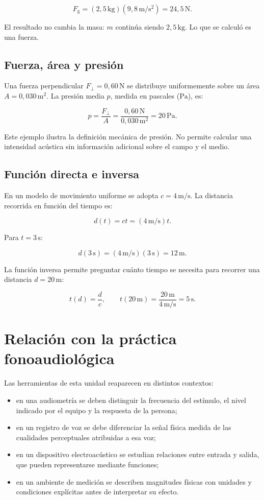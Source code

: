 \[
    F_\mathrm{g}
    =(2{,}5\,\text{kg})(9{,}8\,\text{m}/\text{s}^{2})
    =24{,}5\,\text{N}.
\]

El resultado no cambia la masa: \(m\) continúa siendo \(2{,}5\,\text{kg}\). Lo que se calculó es una fuerza.

\subsection{Fuerza, área y presión}
\label{sec:u1-ejemplo-presion}

Una fuerza perpendicular \(F_\perp=0{,}60\,\text{N}\) se distribuye uniformemente sobre un área \(A=0{,}030\,\text{m}^{2}\). La presión media \(p\), medida en pascales (\(\text{Pa}\)), es:

\[
    p=\frac{F_\perp}{A}
     =\frac{0{,}60\,\text{N}}{0{,}030\,\text{m}^{2}}
     =20\,\text{Pa}.
\]

Este ejemplo ilustra la definición mecánica de presión. No permite calcular una intensidad acústica sin información adicional sobre el campo y el medio.

\subsection{Función directa e inversa}
\label{sec:u1-ejemplo-inversa}

En un modelo de movimiento uniforme se adopta \(c=4\,\text{m}/\text{s}\). La distancia recorrida en función del tiempo es:

\[
    d(t)=ct=(4\,\text{m}/\text{s})t.
\]

Para \(t=3\,\text{s}\):

\[
    d(3\,\text{s})=(4\,\text{m}/\text{s})(3\,\text{s})=12\,\text{m}.
\]

La función inversa permite preguntar cuánto tiempo se necesita para recorrer una distancia \(d=20\,\text{m}\):

\[
    t(d)=\frac{d}{c},
    \qquad
    t(20\,\text{m})
    =\frac{20\,\text{m}}{4\,\text{m}/\text{s}}
    =5\,\text{s}.
\]

\section{Relación con la práctica fonoaudiológica}
\label{sec:u1-relacion-fono}

Las herramientas de esta unidad reaparecen en distintos contextos:

\begin{itemize}
    \item en una audiometría se deben distinguir la frecuencia del estímulo, el nivel indicado por el equipo y la respuesta de la persona;
    \item en un registro de voz se debe diferenciar la señal física medida de las cualidades perceptuales atribuidas a esa voz;
    \item en un dispositivo electroacústico se estudian relaciones entre entrada y salida, que pueden representarse mediante funciones;
    \item en un ambiente de medición se describen magnitudes físicas con unidades y condiciones explícitas antes de interpretar su efecto.
\end{itemize}

